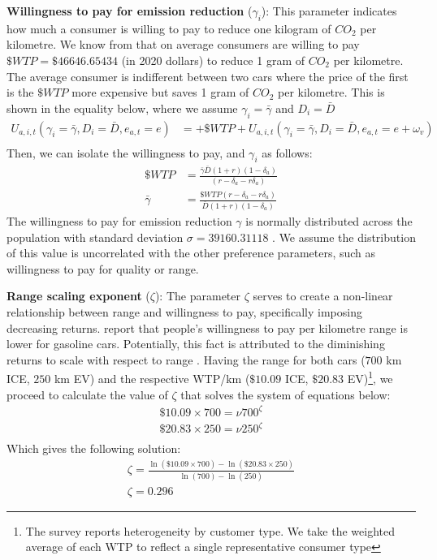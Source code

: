 \documentclass[12pt]{article}
\begin{document}
	\textbf{Willingness to pay for emission reduction} ($\gamma_i$): This parameter indicates how much a consumer is willing to pay to reduce one kilogram of $CO_2$ per kilometre. We know from \citet{hulshof2020willingness} that on average consumers are willing to pay $\$WTP=\$46646.65434$ (in 2020 dollars) to reduce 1 gram of $CO_2$ per kilometre. The average consumer is indifferent between two cars where the price of the first is the $\$WTP$ more expensive but saves 1 gram of $CO_2$ per kilometre. This is shown in the equality below, where we assume $\gamma_i=\bar{\gamma}$ and $D_i=\bar{D}$
	\begin{align}
		U_{a,i,t}(\gamma_i=\bar{\gamma},D_i=\bar{D},e_{a,t}=e)&=+\$WTP+U_{a,i,t}(\gamma_i=\bar{\gamma},D_i=\bar{D},e_{a,t}=e+\omega_v)\\  
	\end{align}
	Then, we can isolate the willingness to pay, and $\gamma_i$ as follows:
	\begin{align}
		\$WTP &= \frac{\bar{\gamma}\bar{D}(1+r)(1-\delta_{a})}{(r-\delta_{a}-r\delta_{a})}\\
		\bar{\gamma} &= \frac{\$WTP(r-\delta_{a}-r\delta_{a})}{\bar{D}(1+r)(1-\delta_{a})}
	\end{align}
	The willingness to pay for emission reduction $\gamma$ is normally distributed across the population with standard deviation $\sigma=39160.31118$ \citep{hulshof2020willingness}. We assume the distribution of this value is uncorrelated with the other preference parameters, such as willingness to pay for quality or range.
	
	\textbf{Range scaling exponent} ($\zeta$): The parameter $\zeta$ serves to create a non-linear relationship between range and willingness to pay, specifically imposing decreasing returns. \citet{FERGUSON2018208} report that people's willingness to pay per kilometre range is lower for gasoline cars. Potentially, this fact is attributed to the diminishing returns to scale with respect to range \citep{HOEN2014199}. Having the range for both cars ($700$ km ICE, $250$ km EV) and the respective WTP/km ($\$10.09$ ICE, $\$20.83$ EV)\footnote{The survey reports heterogeneity by customer type. We take the weighted average of each WTP to reflect a single representative consumer type}, we proceed to calculate the value of $\zeta$ that solves the system of equations below:
	\begin{align}
		\$10.09 \times 700 = \nu 700^\zeta\\
		\$20.83 \times 250 = \nu 250^\zeta\\
	\end{align}
	Which gives the following solution:
	\begin{align}
		\zeta = \frac{\ln{(\$10.09 \times 700)}-\ln{(\$20.83 \times 250)}}{\ln{(700)}-\ln{(250)}}\\
		\zeta = 0.296
	\end{align}
	
\end{document}
